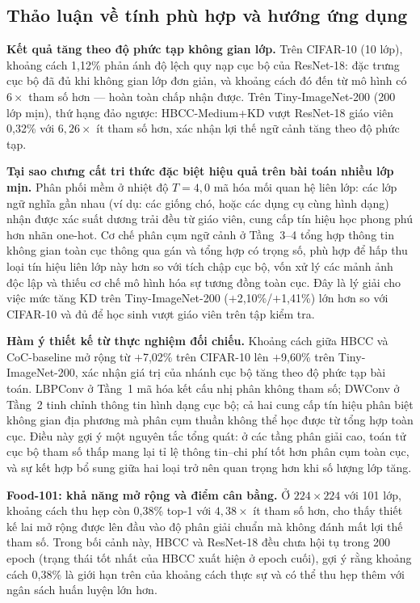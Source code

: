 \documentclass[conference]{IEEEtran}
\begin{document}
\subsection{Thảo luận về tính phù hợp và hướng ứng dụng}
\label{sec:discussion}

\textbf{Kết quả tăng theo độ phức tạp không gian lớp.}
Trên CIFAR-10 (10 lớp), khoảng cách 1,12\% phản ánh độ lệch quy nạp
cục bộ của ResNet-18: đặc trưng cục bộ đã đủ khi không gian lớp đơn
giản, và khoảng cách đó đến từ mô hình có $6\times$ tham số hơn ---
hoàn toàn chấp nhận được. Trên Tiny-ImageNet-200 (200 lớp mịn), thứ
hạng đảo ngược: HBCC-Medium+KD vượt ResNet-18 giáo viên 0,32\% với
$6{,}26\!\times$ ít tham số hơn, xác nhận lợi thế ngữ cảnh tăng theo
độ phức tạp.

\textbf{Tại sao chưng cất tri thức đặc biệt hiệu quả trên bài toán
nhiều lớp mịn.}
Phân phối mềm ở nhiệt độ $T{=}4{,}0$ mã hóa mối quan hệ liên lớp:
các lớp ngữ nghĩa gần nhau (ví dụ: các giống chó, hoặc các dụng cụ
cùng hình dạng) nhận được xác suất dương trải đều từ giáo viên, cung
cấp tín hiệu học phong phú hơn nhãn one-hot. Cơ chế phân cụm ngữ cảnh
ở Tầng~3--4 tổng hợp thông tin không gian toàn cục thông qua gán và
tổng hợp có trọng số, phù hợp để hấp thu loại tín hiệu liên lớp này
hơn so với tích chập cục bộ, vốn xử lý các mảnh ảnh độc lập và thiếu
cơ chế mô hình hóa sự tương đồng toàn cục. Đây là lý giải cho việc
mức tăng KD trên Tiny-ImageNet-200 ($+$2,10\%/$+$1,41\%) lớn hơn so
với CIFAR-10 và đủ để học sinh vượt giáo viên trên tập kiểm tra.

\textbf{Hàm ý thiết kế từ thực nghiệm đối chiếu.}
Khoảng cách giữa HBCC và CoC-baseline mở rộng từ $+$7,02\% trên
CIFAR-10 lên $+$9,60\% trên Tiny-ImageNet-200, xác nhận giá trị của
nhánh cục bộ tăng theo độ phức tạp bài toán. LBPConv ở Tầng~1 mã hóa
kết cấu nhị phân không tham số; DWConv ở Tầng~2 tinh chỉnh thông tin
hình dạng cục bộ; cả hai cung cấp tín hiệu phân biệt không gian địa
phương mà phân cụm thuần không thể học được từ tổng hợp toàn cục.
Điều này gợi ý một nguyên tắc tổng quát: ở các tầng phân giải cao,
toán tử cục bộ tham số thấp mang lại tỉ lệ thông tin--chi phí tốt
hơn phân cụm toàn cục, và sự kết hợp bổ sung giữa hai loại trở nên
quan trọng hơn khi số lượng lớp tăng.

\textbf{Food-101: khả năng mở rộng và điểm cân bằng.}
Ở $224\!\times\!224$ với 101 lớp, khoảng cách thu hẹp còn 0,38\% top-1
với $4{,}38\!\times$ ít tham số hơn, cho thấy thiết kế lai mở rộng được
lên đầu vào độ phân giải chuẩn mà không đánh mất lợi thế tham số.
Trong bối cảnh này, HBCC và ResNet-18 đều chưa hội tụ trong 200
epoch (trạng thái tốt nhất của HBCC xuất hiện ở epoch cuối), gợi ý
rằng khoảng cách 0,38\% là giới hạn trên của khoảng cách thực sự và
có thể thu hẹp thêm với ngân sách huấn luyện lớn hơn.
\end{document}
